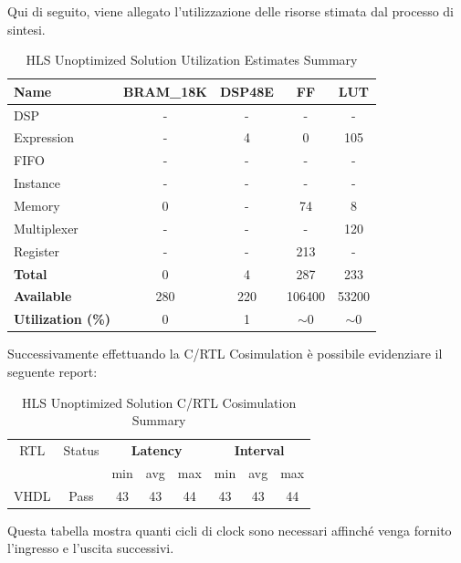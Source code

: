 Qui di seguito, viene allegato l'utilizzazione delle risorse stimata dal processo di sintesi.
\begin{table}[h]
    \centering
    \begin{tabular}{|l|c|c|c|c|}
        \hline
        \textbf{Name}    & \textbf{BRAM\_18K} & \textbf{DSP48E} & \textbf{FF} & \textbf{LUT} \\ \hline
        DSP              & -                   & -               & -           & -            \\ 
        Expression       & -                   & 4               & 0           & 105          \\ 
        FIFO             & -                   & -               & -           & -            \\ 
        Instance         & -                   & -               & -           & -            \\ 
        Memory           & 0                   & -               & 74          & 8            \\ 
        Multiplexer      & -                   & -               & -           & 120          \\ 
        Register         & -                   & -               & 213         & -            \\ \hline
        \textbf{Total}   & 0                   & 4               & 287         & 233          \\ \hline
        \textbf{Available} & 280               & 220             & 106400      & 53200        \\ \hline
        \textbf{Utilization (\%)} & 0            & 1               & $\sim$0     & $\sim$0      \\ \hline
    \end{tabular}
    \caption{HLS Unoptimized Solution Utilization Estimates Summary}
    \label{tab:hls-unoptimized-solution-utilization-estimates-summary}
\end{table}

Successivamente effettuando la C/RTL Cosimulation è possibile evidenziare il seguente report:
\begin{table}[H]
    \centering
    \begin{tabular}{|c|c|c|c|c|c|c|c|}
        \hline
        \multicolumn{1}{|c|}{RTL} & \multicolumn{1}{|c|}{Status} & \multicolumn{3}{c|}{\textbf{Latency}} & \multicolumn{3}{c|}{\textbf{Interval}} \\
        &  & min & avg & max & min & avg & max \\
        \hline
        VHDL & Pass & 43 & 43 & 44 & 43 & 43 & 44 \\
        \hline
    \end{tabular}
    \caption{HLS Unoptimized Solution C/RTL Cosimulation Summary }
    \label{tab:hls-unoptimized-solution-cosimulation-summary}
\end{table}
Questa tabella mostra quanti cicli di clock sono necessari affinché venga fornito l'ingresso e l'uscita successivi.
\\


